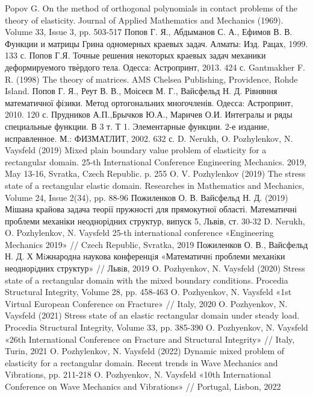 \documentclass[a4paper,14pt]{extarticle}
\numberwithin{equation}{section}
\begin{document}
\begin{thebibliography}{1}
    Popov G. On the method of orthogonal polynomials in contact problems of the theory of elasticity. Journal of Applied Mathematics and Mechanics (1969). Volume 33, Issue 3, pp. 503-517
    Попов Г. Я., Абдыманов С. А., Ефимов В. В. Функции и матрицы Грина одномерных краевых задач. Алматы: Изд. Рацах, 1999. 133 с.
    Попов Г.Я. Точные решения некоторых краевых задач механики деформируемого твѐрдого тела. Одесса: Астропринт, 2013. 424 с.
    Gantmakher F. R. (1998) The theory of matrices. AMS Chelsea Publishing, Providence, Rohde Island.
    Попов Г. Я., Реут В. В., Моісеєв М. Г., Вайсфельд Н. Д. Рівняння математичної фізики. Метод ортогональних многочленів. Одесса: Астропринт, 2010. 120 с.
    Прудников А.П.,Брычков Ю.А., Маричев О.И. Интегралы и ряды специальные функции. В 3 т. Т 1. Элементарные функции. 2-е издание, исправленное. М.: ФИЗМАТЛИТ, 2002. 632 с.
    D. Nerukh, O. Pozhylenkov, N. Vaysfeld (2019) Mixed plain boundary value problem of elasticity for a rectangular domain. 25-th International Conference Engineering Mechanics. 2019, May 13-16, Svratka, Czech Republic. p. 255
    O. V. Pozhylenkov (2019) The stress state of a rectangular elastic domain. Researches in Mathematics and Mechanics, Volume 24, Issue 2(34), pp. 88-96
    Пожиленков О. В. Вайсфельд Н. Д. (2019) Мішана крайова задача теорії пружності для прямокутної області. Математичні проблеми механіки неоднорідних структур, випуск 5, Львів, ст. 30-32
    D. Nerukh, O. Pozhylenkov, N. Vaysfeld 25-th international conference «Engineering Mechanics 2019» // Czech Republic, Svratka, 2019
    Пожиленков О. В., Вайсфельд Н. Д. Х Мiжнародна наукова конференцiя «Математичнi проблеми механiки неоднорiдних структур» // Львiв, 2019
    O. Pozhyenkov, N. Vaysfeld (2020) Stress state of a rectangular domain with the mixed boundary conditions. Procedia Structural Integrity, Volume 28, pp. 458-463
    O. Pozhyenkov, N. Vaysfeld «1st Virtual European Conference on Fracture» // Italy, 2020
    O. Pozhyenkov, N. Vaysfeld (2021) Stress state of an elastic rectangular domain under steady load. Procedia Structural Integrity, Volume 33, pp. 385-390
    O. Pozhyenkov, N. Vaysfeld «26th International Conference on Fracture and Structural Integrity» // Italy, Turin, 2021
    O. Pozhylenkov, N. Vaysfeld (2022) Dynamic mixed problem of elasticity for a rectangular domain. Recent trends in Wave Mechanics and Vibrations, pp. 211-218
    O. Pozhyenkov, N. Vaysfeld «10th International Conference on Wave Mechanics and Vibrations» // Portugal, Lisbon, 2022
\end{thebibliography}
\newpage
\end{document}
